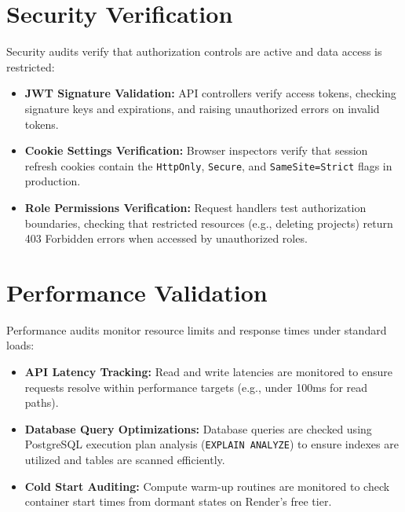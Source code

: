 \section{Security Verification}
Security audits verify that authorization controls are active and data access is restricted:
\begin{itemize}
    \item \textbf{JWT Signature Validation:} API controllers verify access tokens, checking signature keys and expirations, and raising unauthorized errors on invalid tokens.
    \item \textbf{Cookie Settings Verification:} Browser inspectors verify that session refresh cookies contain the \texttt{HttpOnly}, \texttt{Secure}, and \texttt{SameSite=Strict} flags in production.
    \item \textbf{Role Permissions Verification:} Request handlers test authorization boundaries, checking that restricted resources (e.g., deleting projects) return 403 Forbidden errors when accessed by unauthorized roles.
\end{itemize}

\section{Performance Validation}
Performance audits monitor resource limits and response times under standard loads:
\begin{itemize}
    \item \textbf{API Latency Tracking:} Read and write latencies are monitored to ensure requests resolve within performance targets (e.g., under 100ms for read paths).
    \item \textbf{Database Query Optimizations:} Database queries are checked using PostgreSQL execution plan analysis (\texttt{EXPLAIN ANALYZE}) to ensure indexes are utilized and tables are scanned efficiently.
    \item \textbf{Cold Start Auditing:} Compute warm-up routines are monitored to check container start times from dormant states on Render's free tier.
\end{itemize}

